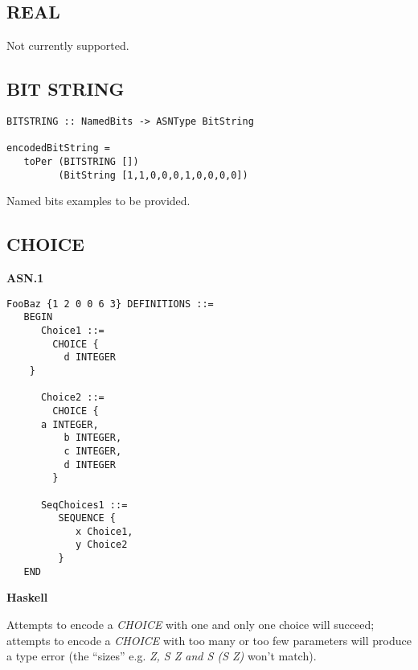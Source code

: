 \documentclass{article}
\begin{document}
\subsection{REAL}

Not currently supported.

\subsection{BIT STRING}

\begin{lstlisting}[frame=single]
BITSTRING :: NamedBits -> ASNType BitString

encodedBitString = 
   toPer (BITSTRING []) 
         (BitString [1,1,0,0,0,1,0,0,0,0])
\end{lstlisting}

Named bits examples to be provided.

\subsection{CHOICE}

{\bf ASN.1}

\begin{lstlisting}[frame=single]
FooBaz {1 2 0 0 6 3} DEFINITIONS ::=
   BEGIN
      Choice1 ::= 
        CHOICE {
          d INTEGER
	}
      
      Choice2 ::= 
        CHOICE {
	  a INTEGER,
          b INTEGER,
          c INTEGER,
          d INTEGER
        }

      SeqChoices1 ::=
         SEQUENCE {
            x Choice1,
            y Choice2
         }
   END

\end{lstlisting}

{\bf Haskell}

Attempts to encode a {\em CHOICE} with one and only one choice will 
succeed; attempts to encode a {\em CHOICE} with too many or too few
parameters will produce a type error (the ``sizes'' e.g. {\em Z, S Z and S (S Z)} won't match).
\end{document}
